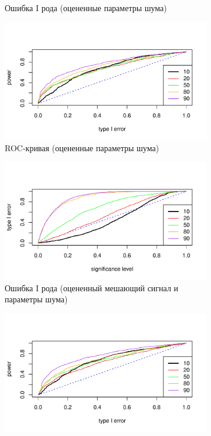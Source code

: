 \documentclass[specialist,
substylefile = spbu.rtx,
               subf,href,colorlinks=true, 12pt]{disser}
\theoremstyle{definition}
\begin{document}
\begin{figure}[h!]
\begin{subfigure}[t]{0.5\textwidth}
		\caption{Ошибка I рода (оцененные параметры шума)}
		\label{fig:sin_est_noise_type1error}
	\end{subfigure}\hspace{\fill}
	\begin{subfigure}[t]{0.5\textwidth}
		\centering
		\includegraphics[width=\textwidth]{img/roc_sin_est_noise.pdf}
		\caption{ROC-кривая (оцененные параметры шума)}
		\label{fig:sin_est_noise_roc}
	\end{subfigure}
	\begin{subfigure}[t]{0.5\textwidth}
		\centering
		\includegraphics[width=\textwidth]{img/type1error_sin_est_noise_signal.pdf}
		\caption{Ошибка I рода (оцененный мешающий сигнал и параметры шума)}
		\label{fig:sin_est_noise_signal_type1error}
	\end{subfigure}\hspace{\fill}
	\begin{subfigure}[t]{0.5\textwidth}
		\centering
		\includegraphics[width=\textwidth]{img/roc_sin_est_noise_signal.pdf}

\end{subfigure}
\end{figure}
\end{document}
